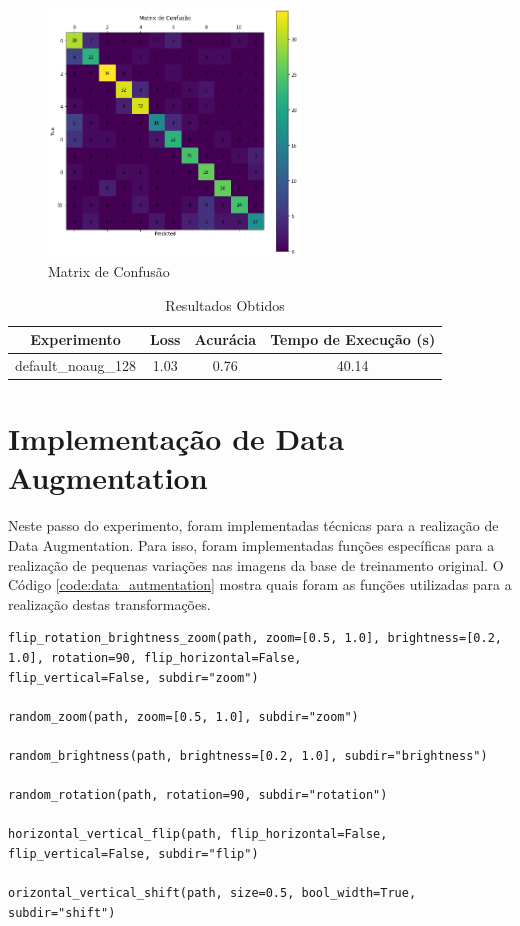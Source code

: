 \documentclass[12pt]{article}
\begin{document}
\begin{figure}[!htb]
  \centering
  \includegraphics[width=18em]{experiments/default_noaug_128/confusion_matrix.png}
  \caption{Matrix de Confusão}
  \label{fig:experiment_default_noaug_128_confusion_matrix}
\end{figure}

\begin{table}[!htb]
  \centering
  \begin{tabular}{|c|c|c|c|}
    \hline
    \textbf{Experimento} & \textbf{Loss} & \textbf{Acurácia} & \textbf{Tempo de Execução (s)} \\ \hline
    default\_noaug\_128  & 1.03          & 0.76              & 40.14                          \\ \hline
  \end{tabular}
  \caption{Resultados Obtidos}
  \label{tab:experiment_default_noaug_128_reults}
\end{table}

\newpage

\section{Implementação de Data Augmentation}

Neste passo do experimento, foram implementadas técnicas para a realização de Data Augmentation. Para isso, foram implementadas funções específicas para a realização de pequenas variações nas imagens da base de treinamento original. O Código \ref{code:data_autmentation} mostra quais foram as funções utilizadas para a realização destas transformações.

\begin{lstlisting}[caption={Funções de Transformação das Imagens},captionpos=b,frame=single,label={code:data_autmentation}]
flip_rotation_brightness_zoom(path, zoom=[0.5, 1.0], brightness=[0.2, 1.0], rotation=90, flip_horizontal=False,
flip_vertical=False, subdir="zoom")

random_zoom(path, zoom=[0.5, 1.0], subdir="zoom")

random_brightness(path, brightness=[0.2, 1.0], subdir="brightness")

random_rotation(path, rotation=90, subdir="rotation")

horizontal_vertical_flip(path, flip_horizontal=False, flip_vertical=False, subdir="flip")

orizontal_vertical_shift(path, size=0.5, bool_width=True, subdir="shift")
\end{lstlisting}
\end{document}
